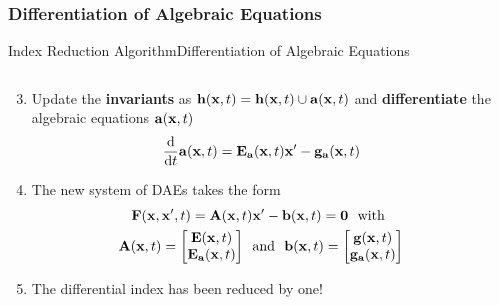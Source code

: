 \subsubsection{Differentiation of Algebraic Equations}

\begin{frame}{Index Reduction Algorithm}{Differentiation of Algebraic Equations}
  \vspace{-1.5em}
  \begin{columns}
    \begin{column}[c]{0.6\textwidth}
      \begin{enumerate}[<+->]\setcounter{enumi}{2}
        \item Update the \textbf{invariants} as $\mathbf{h}(\mathbf{x}, t) = \mathbf{h}(\mathbf{x}, t) \cup \mathbf{a}(\mathbf{x}, t)$ and \textbf{differentiate} the algebraic equations $\mathbf{a}(\mathbf{x}, t)$
        \begin{equation*}
          \dfrac{\text{d}}{\text{d}t} \mathbf{a}(\mathbf{x}, t) = \mathbf{E}_{\mathbf{a}}(\mathbf{x}, t) \mathbf{x}^\prime - \mathbf{g}_{\mathbf{a}}(\mathbf{x}, t)
        \end{equation*}
        \item The new system of \acsp{DAE} takes the form
        \begin{align*}
          \mathbf{F}(\mathbf{x}, \mathbf{x}^\prime, t) = \mathbf{A}(\mathbf{x}, t) &\mathbf{x}^\prime - \mathbf{b}(\mathbf{x}, t) = \mathbf{0} ~~ \text{with} \\
          \mathbf{A}(\mathbf{x}, t) = \begin{bmatrix} \mathbf{E}(\mathbf{x}, t) \\ \mathbf{E}_{\mathbf{a}}(\mathbf{x}, t) \end{bmatrix}
          ~~ &\text{and} ~~
          \mathbf{b}(\mathbf{x}, t) = \begin{bmatrix} \mathbf{g}(\mathbf{x}, t) \\ \mathbf{g}_{\mathbf{a}}(\mathbf{x}, t) \end{bmatrix}
        \end{align*}
        \item The differential index has been reduced by one!
      \end{enumerate}
    \end{column}
    \begin{column}[c]{0.4\textwidth}
    \end{column}
  \end{columns}
\end{frame}

